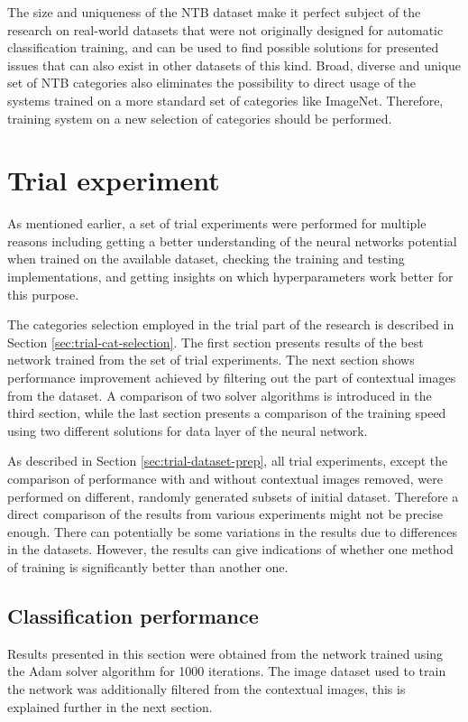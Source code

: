 The size and uniqueness of the NTB dataset make it perfect subject of the research on real-world datasets that were not originally designed for automatic classification training, and can be used to find possible solutions for presented issues that can also exist in other datasets of this kind. Broad, diverse and unique set of NTB categories also eliminates the possibility to direct usage of the systems trained on a more standard set of categories like ImageNet. Therefore, training system on a new selection of categories should be performed.


\section{Trial experiment}
As mentioned earlier, a set of trial experiments were performed for multiple reasons including getting a better understanding of the neural networks potential when trained on the available dataset, checking the training and testing implementations, and getting insights on which hyperparameters work better for this purpose.

The categories selection employed in the trial part of the research is described in Section \ref{sec:trial-cat-selection}. The first section presents results of the best network trained from the set of trial experiments. The next section shows performance improvement achieved by filtering out the part of contextual images from the dataset. A comparison of two solver algorithms is introduced in the third section, while the last section presents a comparison of the training speed using two different solutions for data layer of the neural network.

As described in Section \ref{sec:trial-dataset-prep}, all trial experiments, except the comparison of performance with and without contextual images removed, were performed on different, randomly generated subsets of initial dataset. Therefore a direct comparison of the results from various experiments might not be precise enough. There can potentially be some variations in the results due to differences in the datasets. However, the results can give indications of whether one method of training is significantly better than another one.

\subsection{Classification performance}
    Results presented in this section were obtained from the network trained using the Adam solver algorithm for 1000 iterations. The image dataset used to train the network was additionally filtered from the contextual images, this is explained further in the next section.
    
